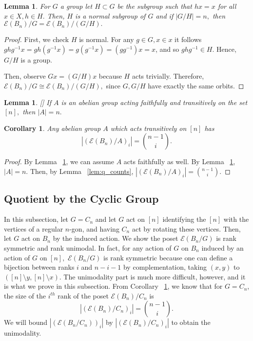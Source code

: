 \documentclass[10 pt]{amsart}
\theoremstyle{plain}
\newtheorem{lem}[thm]{Lemma}
\newtheorem{cor}[thm]{Corollary}
\theoremstyle{definition}
\theoremstyle{remark}
\numberwithin{equation}{section}
\newcommand\ssec{\subsection}
\begin{document}
\begin{lem}
\label{lem:faithful_action}
For $G$ a group let $H \subset G$ be the subgroup such that $hx = x$ for all $x \in X,h \in H.$ Then, $H$ is a normal subgroup of $G$ and if $|G/H| = n,$ then $\mathcal E(B_n)/G =\mathcal E(B_n)/(G/H).$
\end{lem}
\begin{proof}
First, we check $H$ is normal. For any $g \in G,x \in x$ it follows $ghg^{-1}x = gh(g^{-1}x) = g(g^{-1}x) = (gg^{-1})x = x$, and so $ghg^{-1} \in H.$ Hence, $G/H$ is a group.

Then, observe $Gx = (G/H)x$ because $H$ acts trivially. Therefore, $\mathcal E(B_n)/G \cong \mathcal E(B_n)/(G/H),$ since $G,G/H$ have exactly the same orbits.
\end{proof}

\begin{lem}
\label{lem:transitive_abelian}[\cite{Stack}]
If $A$ is an abelian group acting faithfully and transitively on the set $[n],$ then $|A| = n.$
\end{lem}

\begin{cor}
\label{cor:transitive_abelian_ranks}
Any abelian group $A$ which acts transitively on $[n]$ has $$|(\mathcal E (B_n)/A)_i|= \binom{n-1}{i}.$$
\end{cor}
\begin{proof}
By Lemma ~\ref{lem:faithful_action}, we can assume $A$ acts faithfully as well.
By Lemma ~\ref{lem:transitive_abelian}, $|A| = n.$ Then, by Lemma ~\ref{lem:q_counts}, $ \displaystyle |(\mathcal E (B_n)/A)_i| = \binom{n-1}{i}.$
\end{proof}






\ssec{Quotient by the Cyclic Group}
\label{sec:cyclic}

In this subsection, let $G = C_n$ and let $G$ act on $[n]$ identifying the $[n]$ with the vertices of a regular $n$-gon, and having $C_n$ act by rotating these vertices. Then, let $G$ act on $B_n$ by the induced action. We show the poset $ \mathcal E(B_n/G)$ is rank symmetric and rank unimodal. In fact, for any action of $G$ on $B_n$ induced by an action of $G$ on $[n],$ $\mathcal E(B_n/G)$ is rank symmetric because one can define a bijection between ranks $i$ and $n-i-1$ by complementation, taking $(x,y)$ to $([n]\setminus y,[n]\setminus x)$. The unimodality part is much more difficult, however, and it is what we prove in this subsection. From Corollary ~\ref{cor:transitive_abelian_ranks}, we know that for $G = C_n$, the size of the $i^{th}$ rank of the poset $ \mathcal E (B_n)/C_n$ is $$|( \mathcal E (B_n)/C_n)_i| = \binom{n-1}{i}.$$
We will bound $|( \mathcal E(B_n/C_n))_i|$ by  $|( \mathcal E (B_n)/C_n)_i|$ to obtain the unimodality. 
\end{document}
